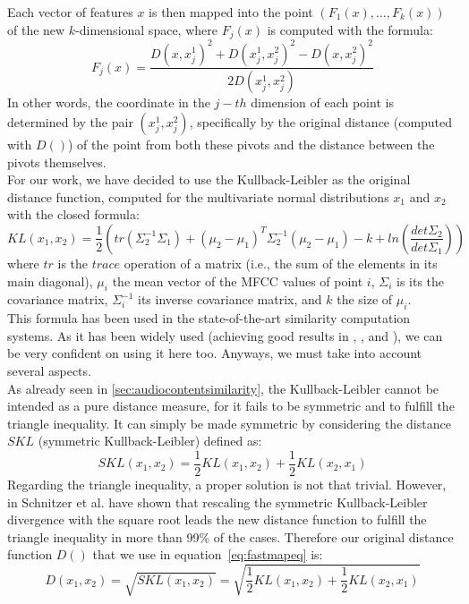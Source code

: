 Each vector of features $x$ is then mapped into the point $(F_1(x), ..., F_k(x))$ of the new $k$-dimensional space, where $F_j(x)$ is computed with the formula:
\begin{equation}
\label{eq:fastmapeq}
F_j(x) = \frac{D(x, x_j^1)^2 + D(x_j^1, x_j^2)^2 - D(x, x_j^2)^2}{2D(x_j^1, x_j^2)}
\end{equation}
In other words, the coordinate in the $j-th$ dimension of each point is determined by the pair $(x_j^1, x_j^2)$, specifically by the original distance (computed with $D()$) of the point from both these pivots and the distance between the pivots themselves. \\
For our work, we have decided to use the Kullback-Leibler as the original distance function, computed for the multivariate normal distributions $x_1$ and $x_2$ with the closed formula:
\begin{equation}
KL(x_1, x_2) = \frac{1}{2}\left(tr(\Sigma_2^{-1}\Sigma_1) + (\mu_2 - \mu_1)^T \Sigma_2^{-1}(\mu_2 - \mu_1) - k + ln\left(\frac{det\Sigma_2}{det\Sigma_1}\right)\right)
\end{equation}
where $tr$ is the $trace$ operation of a matrix (i.e., the sum of the elements in its main diagonal), $\mu_i$ the mean vector of the MFCC values of point $i$, $\Sigma_i$ is its the covariance matrix, $\Sigma_i^{-1}$ its inverse covariance matrix, and $k$ the size of $\mu_i$. \\
This formula has been used in the state-of-the-art similarity computation systems. As it has been widely used (achieving good results in \cite{mirage07}, \cite{perfe11}, and \cite{fastmap12}), we can be very confident on using it here too. Anyways, we must take into account several aspects. \\ 
As already seen in \ref{sec:audiocontentsimilarity}, the Kullback-Leibler cannot be intended as a pure distance measure, for it fails to be symmetric and to fulfill the triangle inequality. It can simply be made symmetric by considering the distance $SKL$ (symmetric Kullback-Leibler) defined as:
\begin{equation}
SKL(x_1, x_2) = \frac{1}{2}KL(x_1, x_2) + \frac{1}{2}KL(x_2, x_1)
\end{equation}
Regarding the triangle inequality, a proper solution is not that trivial. However, in \cite{fastmap12} Schnitzer et al. have shown that rescaling the symmetric Kullback-Leibler divergence with the square root leads the new distance function to fulfill the triangle inequality in more than 99\% of the cases. Therefore our original distance function $D()$ that we use in equation~\ref{eq:fastmapeq} is:
\begin{equation}
\label{eq:distance_func}
D(x_1, x_2) = \sqrt{SKL(x_1, x_2)} = \sqrt{\frac{1}{2}KL(x_1, x_2) + \frac{1}{2}KL(x_2, x_1)}
\end{equation}

